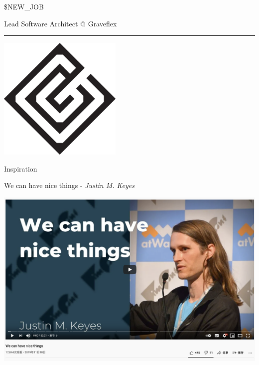 \documentclass{beamer}
\begin{document}
\begin{frame}{\$NEW\_JOB}

	Lead Software Architect @ Graveflex

	\rule{\textwidth}{0.1em}

	\begin{center}

		\includegraphics[width=16em,height=16em]{graveflex}

	\end{center}

\end{frame}


\begin{frame}{Inspiration}

	We can have nice things - \textit{Justin M. Keyes}

	\vspace{1em}

	\includegraphics[width=\textwidth]{we_can_have_nice}

\end{frame}
\end{document}

